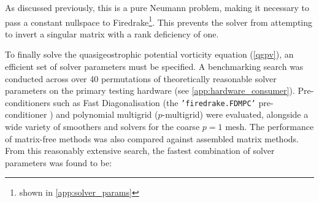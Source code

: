 \documentclass{article}
\begin{document}
As discussed previously, this is a pure Neumann problem, making it necessary to pass a constant nullspace to Firedrake\footnote{shown in \cref{app:solver_params}}.
This prevents the solver from attempting to invert a singular matrix with a rank deficiency of one.

To finally solve the quasigeostrophic potential vorticity equation (\cref{qgpv}), an efficient set of solver parameters must be specified.
A benchmarking search was conducted across over 40 permutations of theoretically reasonable solver parameters on the primary testing hardware (see \cref{app:hardware_consumer}).
Pre-conditioners such as Fast Diagonalisation (the \texttt{'firedrake.FDMPC'} pre-conditioner \cite{FiredrakeUserManual}) and polynomial multigrid ($p$-multigrid) were evaluated, alongside a wide variety of smoothers and solvers for the coarse $p=1$ mesh.
The performance of matrix-free methods was also compared against assembled matrix methods.
From this reasonably extensive search, the fastest combination of solver parameters was found to be:
\end{document}
